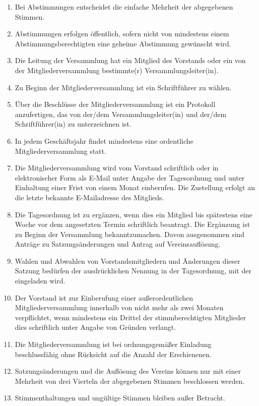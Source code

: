 \documentclass[12pt,a4paper,draft]{article}
\begin{document}
\begin{enumerate}
\item Bei Abstimmungen entscheidet die einfache Mehrheit der abgegebenen 
Stimmen.

\item Abstimmungen erfolgen öffentlich, sofern nicht von mindestens einem 
Abstimmungsberechtigten eine geheime Abstimmung gewünscht wird.

\item Die Leitung der Versammlung hat ein Mitglied des Vorstands oder ein von 
der Mitgliederversammlung bestimmte(r) Versammlungsleiter(in).

\item Zu Beginn der Mitgliederversammlung ist ein Schriftführer zu wählen.

\item Über die Beschlüsse der Mitgliederversammlung ist ein Protokoll 
anzufertigen, das von der/dem Versammlungsleiter(in) und der/dem 
Schriftführer(in) zu unterzeichnen ist.


\item In jedem Geschäftsjahr findet mindestens eine ordentliche 
Mitgliederversammlung statt.

\item Die Mitgliederversammlung wird vom Vorstand schriftlich oder in 
elektronischer Form als E-Mail unter Angabe der Tagesordnung und unter 
Einhaltung einer Frist von einem Monat einberufen. %
Die Zustellung erfolgt an die letzte bekannte E-Mailadresse des Mitglieds.

\item Die Tagesordnung ist zu ergänzen, wenn dies ein Mitglied bis spätestens 
eine Woche vor dem angesetzten Termin schriftlich beantragt. Die Ergänzung 
ist zu Beginn der Versammlung bekanntzumachen. Davon ausgenommen sind Anträge zu Satzungsänderungen und Antrag auf Vereinsauflösung.

\item Wahlen und Abwahlen von Vorstandsmitgliedern und Änderungen dieser 
Satzung bedürfen der ausdrücklichen Nennung in der Tagesordnung, mit der 
eingeladen wird.

\item Der Vorstand ist zur Einberufung einer außerordentlichen 
Mitgliederversammlung innerhalb von nicht mehr als zwei Monaten verpflichtet, 
wenn mindestens ein Drittel der stimmberechtigten Mitglieder dies schriftlich unter Angabe von 
Gründen verlangt. %

\item Die Mitgliederversammlung ist bei ordnungsgemäßer Einladung 
beschlussfähig ohne Rücksicht auf die Anzahl der Erschienenen.

\item Satzungsänderungen und die Auflösung des Vereins können nur mit einer 
Mehrheit von drei Vierteln der abgegebenen Stimmen beschlossen werden. 

\item Stimmenthaltungen und ungültige Stimmen bleiben außer Betracht.
\end{enumerate}
\end{document}
